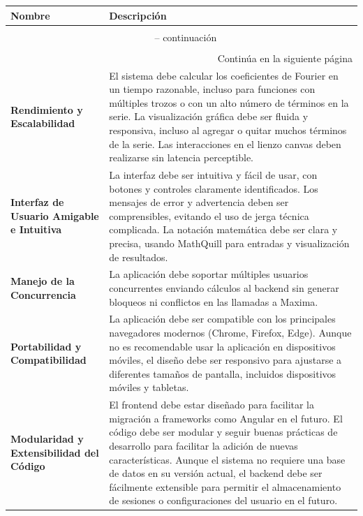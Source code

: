 \begin{longtable}{|m{5cm}|m{10cm}|}
	\hline
	\rowcolor{black!75} \color{white}\textbf{Nombre} & \color{white}\textbf{Descripción} \\
	\hline
	\rowcolor{black!75}
	\head {Nombre} & \head {Descripción} \\ \hline
	\endfirsthead
	\multicolumn{2}{c}{{\tablename\ \thetable{} -- continuación}} \\
	\rowcolor{black!75}
	\head {Nombre} & \head {Descripción}\\ \hline
	\endhead
	\hline \multicolumn{2}{r}{{Continúa en la siguiente página}} \\
	\endfoot
	\hline
	\endlastfoot
	\textbf{Rendimiento y Escalabilidad} & El sistema debe calcular los coeficientes de Fourier en un tiempo razonable, incluso para funciones con múltiples trozos o con un alto número de términos en la serie. La visualización gráfica debe ser fluida y responsiva, incluso al agregar o quitar muchos términos de la serie. Las interacciones en el lienzo canvas deben realizarse sin latencia perceptible. \\
	\hline
	\textbf{Interfaz de Usuario Amigable e Intuitiva} & La interfaz debe ser intuitiva y fácil de usar, con botones y controles claramente identificados. Los mensajes de error y advertencia deben ser comprensibles, evitando el uso de jerga técnica complicada. La notación matemática debe ser clara y precisa, usando MathQuill para entradas y visualización de resultados. \\
	\hline
	\textbf{Manejo de la Concurrencia} & La aplicación debe soportar múltiples usuarios concurrentes enviando cálculos al backend sin generar bloqueos ni conflictos en las llamadas a Maxima. \\
	\hline
	\textbf{Portabilidad y Compatibilidad} & La aplicación debe ser compatible con los principales navegadores modernos (Chrome, Firefox, Edge). Aunque no es recomendable usar la aplicación en dispositivos móviles, el diseño debe ser responsivo para ajustarse a diferentes tamaños de pantalla, incluidos dispositivos móviles y tabletas. \\
	\hline
	\textbf{Modularidad y Extensibilidad del Código} & El frontend debe estar diseñado para facilitar la migración a frameworks como Angular en el futuro. El código debe ser modular y seguir buenas prácticas de desarrollo para facilitar la adición de nuevas características. Aunque el sistema no requiere una base de datos en su versión actual, el backend debe ser fácilmente extensible para permitir el almacenamiento de sesiones o configuraciones del usuario en el futuro. \\

\end{longtable}
